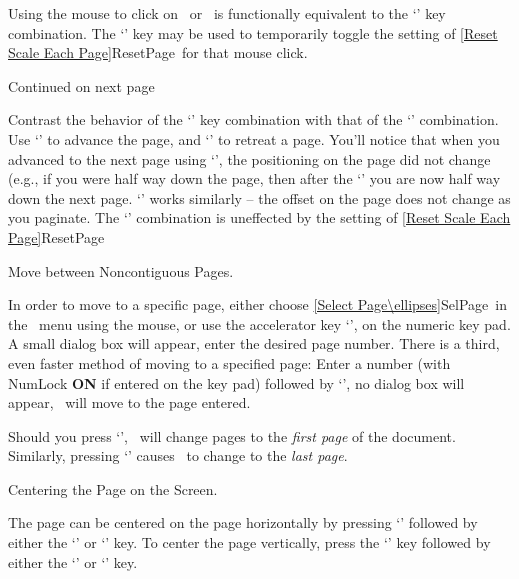 Using the mouse to click on \ or \ is functionally
equivalent to the `' key combination.  The `'
key may be used to temporarily toggle the setting of \ref{Reset Scale Each
Page}{ResetPage}\ for that mouse click.

	\medskip

Continued on next page\ellipses

\newpage

Contrast the behavior of the `' key combination
with that of the `' combination.  Use
`' to advance the page, and `' to retreat a
page.  You'll notice that when you advanced to the next page using
`', the positioning on the page did not change (e.g., if you
were half way down the page, then after the `' you are now 
half way down the next page. `' works similarly -- the
offset on the page does not change as you paginate.  The
`' combination is uneffected by the setting of
\ref{Reset Scale Each Page}{ResetPage}

\newpage

Move between Noncontiguous Pages.

In order to move to a specific page, either choose \ref{Select
Page\ellipses}{SelPage}\ in the \ menu using the mouse, or use the
accelerator key `\asterisk', on the numeric key pad.  A small dialog
box will appear, enter the desired page number.  There is a third, even
faster method of moving to a specified page: Enter a number (with
NumLock {\bf ON} if entered on the key pad) followed by `', no
dialog box will appear, \ will move to the page entered.

Should you press `', \ will change pages to the
{\it first page} of the document.  Similarly, pressing `' causes
\ to change to the {\it last page}.
   \bigskip

Centering the Page on the Screen.

The page can be centered on the page horizontally by pressing `'
followed by either the `' or `' key.  To
center the page vertically, press the `' key followed by
either the `' or `' key.

\newpage



